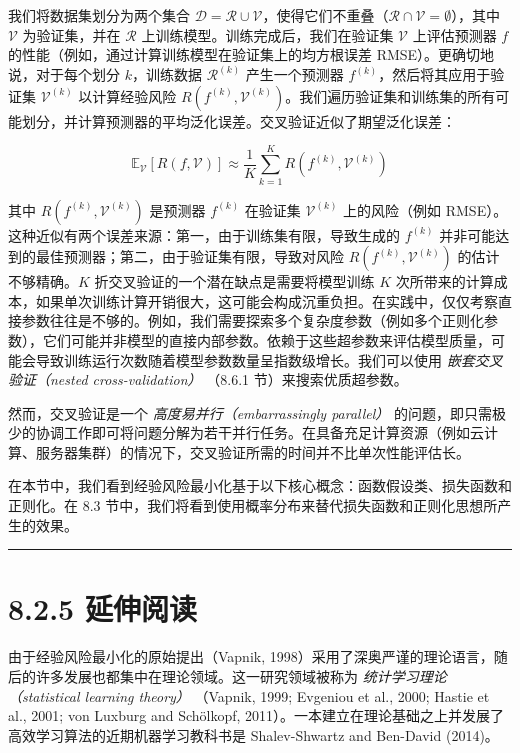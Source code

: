 我们将数据集划分为两个集合 $ \mathcal{D} = \mathcal{R} \cup \mathcal{V} $，使得它们不重叠（$ \mathcal{R} \cap \mathcal{V} = \emptyset $），其中 $ \mathcal{V} $ 为验证集，并在 $ \mathcal{R} $ 上训练模型。训练完成后，我们在验证集 $ \mathcal{V} $ 上评估预测器 $ f $ 的性能（例如，通过计算训练模型在验证集上的均方根误差 RMSE）。更确切地说，对于每个划分 $ k $，训练数据 $ \mathcal{R}^{(k)} $ 产生一个预测器 $ f^{(k)} $，然后将其应用于验证集 $ \mathcal{V}^{(k)} $ 以计算经验风险 $ R(f^{(k)}, \mathcal{V}^{(k)}) $。我们遍历验证集和训练集的所有可能划分，并计算预测器的平均泛化误差。交叉验证近似了期望泛化误差：

\begin{equation}
\mathbb{E}_{\mathcal{V}}[R(f, \mathcal{V})] \approx \frac{1}{K} \sum_{k=1}^K R(f^{(k)}, \mathcal{V}^{(k)})
\tag{8.13}\label{eq:8-13}
\end{equation}

其中 $ R(f^{(k)}, \mathcal{V}^{(k)}) $ 是预测器 $ f^{(k)} $ 在验证集 $ \mathcal{V}^{(k)} $ 上的风险（例如 RMSE）。这种近似有两个误差来源：第一，由于训练集有限，导致生成的 $ f^{(k)} $ 并非可能达到的最佳预测器；第二，由于验证集有限，导致对风险 $ R(f^{(k)}, \mathcal{V}^{(k)}) $ 的估计不够精确。$ K $ 折交叉验证的一个潜在缺点是需要将模型训练 $ K $ 次所带来的计算成本，如果单次训练计算开销很大，这可能会构成沉重负担。在实践中，仅仅考察直接参数往往是不够的。例如，我们需要探索多个复杂度参数（例如多个正则化参数），它们可能并非模型的直接内部参数。依赖于这些超参数来评估模型质量，可能会导致训练运行次数随着模型参数数量呈指数级增长。我们可以使用 \emph{嵌套交叉验证（nested cross-validation）} （8.6.1 节）来搜索优质超参数。

然而，交叉验证是一个 \emph{高度易并行（embarrassingly parallel）} 的问题，即只需极少的协调工作即可将问题分解为若干并行任务。在具备充足计算资源（例如云计算、服务器集群）的情况下，交叉验证所需的时间并不比单次性能评估长。

在本节中，我们看到经验风险最小化基于以下核心概念：函数假设类、损失函数和正则化。在 8.3 节中，我们将看到使用概率分布来替代损失函数和正则化思想所产生的效果。

\medskip\hrule\medskip

\section*{8.2.5 延伸阅读}

由于经验风险最小化的原始提出（Vapnik, 1998）采用了深奥严谨的理论语言，随后的许多发展也都集中在理论领域。这一研究领域被称为 \emph{统计学习理论（statistical learning theory）} （Vapnik, 1999; Evgeniou et al., 2000; Hastie et al., 2001; von Luxburg and Schölkopf, 2011）。一本建立在理论基础之上并发展了高效学习算法的近期机器学习教科书是 Shalev-Shwartz and Ben-David (2014)。

